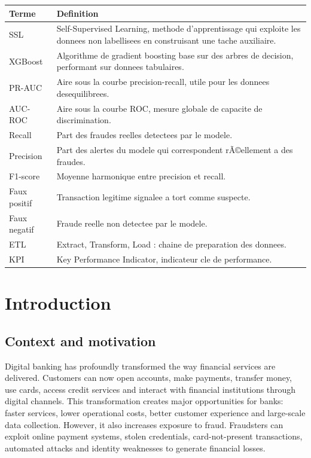 ﻿\documentclass[12pt,a4paper,oneside]{report}
\begin{document}
\begin{longtable}{p{3cm}p{11cm}}
\toprule
\textbf{Terme} & \textbf{Definition} \\
\midrule
SSL & Self-Supervised Learning, methode d'apprentissage qui exploite les donnees non labellisees en construisant une tache auxiliaire. \\
XGBoost & Algorithme de gradient boosting base sur des arbres de decision, performant sur donnees tabulaires. \\
PR-AUC & Aire sous la courbe precision-recall, utile pour les donnees desequilibrees. \\
AUC-ROC & Aire sous la courbe ROC, mesure globale de capacite de discrimination. \\
Recall & Part des fraudes reelles detectees par le modele. \\
Precision & Part des alertes du modele qui correspondent rÃ©ellement a des fraudes. \\
F1-score & Moyenne harmonique entre precision et recall. \\
Faux positif & Transaction legitime signalee a tort comme suspecte. \\
Faux negatif & Fraude reelle non detectee par le modele. \\
ETL & Extract, Transform, Load : chaine de preparation des donnees. \\
KPI & Key Performance Indicator, indicateur cle de performance. \\
\bottomrule
\end{longtable}

\chapter{Introduction}

\section{Context and motivation}

Digital banking has profoundly transformed the way financial services are delivered. Customers can now open accounts, make payments, transfer money, use cards, access credit services and interact with financial institutions through digital channels. This transformation creates major opportunities for banks: faster services, lower operational costs, better customer experience and large-scale data collection. However, it also increases exposure to fraud. Fraudsters can exploit online payment systems, stolen credentials, card-not-present transactions, automated attacks and identity weaknesses to generate financial losses.
\end{document}
